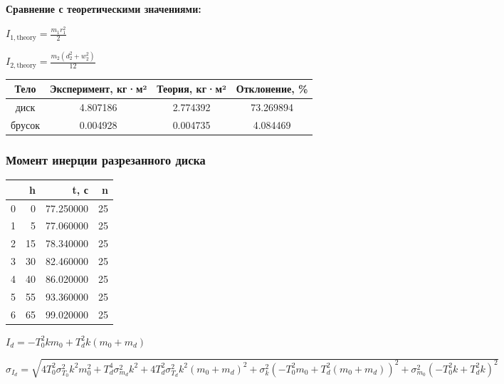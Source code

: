\documentclass[12pt]{extarticle}
\begin{document}
\vspace{5mm}

\textbf{\large{Сравнение с теоретическими значениями:}}

\vspace{3mm}

$\displaystyle I_{1,\mathrm{theory}} = \frac{m_{1} r_{1}^{2}}{2}$

\vspace{3mm}

$\displaystyle I_{2,\mathrm{theory}} = \frac{m_{2} \left(d_{2}^{2} + w_{2}^{2}\right)}{12}$

\vspace{3mm}

\begin{tabular}{cccc}
\toprule
Тело & Эксперимент, кг·м² & Теория, кг·м² & Отклонение, \% \\
\midrule 
диск & 4.807186 & 2.774392 & 73.269894 \\
брусок & 0.004928 & 0.004735 & 4.084469 \\
\bottomrule
\end{tabular}

\subsubsection{Момент инерции разрезанного диска}

\vspace{5mm}

\begin{tabular}{lrrr}
\toprule
 & h & t, с & n \\
\midrule
0 & 0 & 77.250000 & 25 \\
1 & 5 & 77.060000 & 25 \\
2 & 15 & 78.340000 & 25 \\
3 & 30 & 82.460000 & 25 \\
4 & 40 & 86.020000 & 25 \\
5 & 55 & 93.360000 & 25 \\
6 & 65 & 99.020000 & 25 \\
\bottomrule
\end{tabular}

\vspace{5mm}

$\displaystyle I_{d} = - T_{0}^{2} k m_{0} + T_{d}^{2} k \left(m_{0} + m_{d}\right)$

\vspace{5mm}

$\displaystyle \sigma_{I_d} = \sqrt{4 T_{0}^{2} \sigma_{T_0}^{2} k^{2} m_{0}^{2} + T_{d}^{4} \sigma_{m_d}^{2} k^{2} + 4 T_{d}^{2} \sigma_{T_d}^{2} k^{2} \left(m_{0} + m_{d}\right)^{2} + \sigma_{k}^{2} \left(- T_{0}^{2} m_{0} + T_{d}^{2} \left(m_{0} + m_{d}\right)\right)^{2} + \sigma_{m_0}^{2} \left(- T_{0}^{2} k + T_{d}^{2} k\right)^{2}}$
\end{document}
